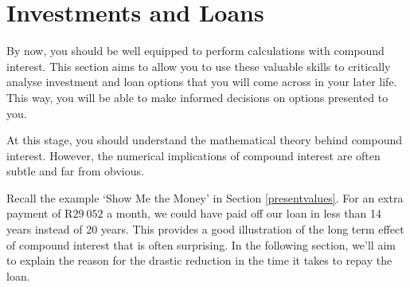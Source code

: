 
\section{Investments and Loans}
\label{s:investmentandloans}

By now, you should be well equipped to perform calculations with compound interest. This section aims to allow you to use these valuable skills to critically analyse investment and loan options that you will come across in your later life. This way, you will be able to make informed decisions on options presented to you.

At this stage, you should understand the mathematical theory behind compound interest. However, the numerical implications of compound interest are often subtle and far from obvious.

Recall the example `Show Me the Money' in Section \ref{presentvalues}. For an extra payment of R$29~052$ a month, we could have paid off our loan in less than 14 years instead of 20 years. This provides a good illustration of the long term effect of compound interest that is often surprising. In the following section, we'll aim to explain the reason for the drastic reduction in the time it takes to repay the loan.

